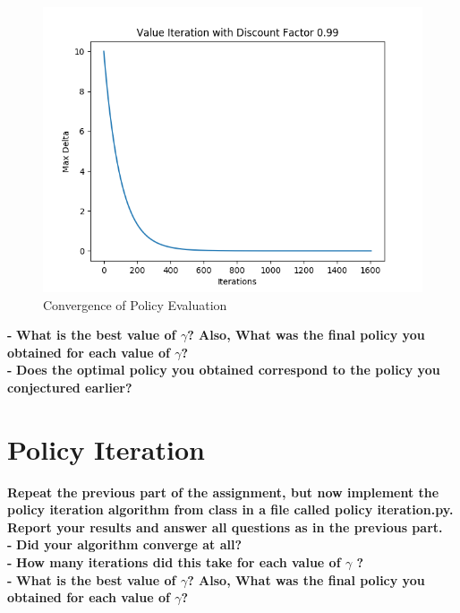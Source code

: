 \documentclass[11pt]{article}
\begin{document}
\begin{figure}[h]
\includegraphics[scale=0.7]{Value_99}
\centering
\caption{Convergence of Policy Evaluation}
\end{figure}

\noindent
\textbf{-}
\noindent
\textbf{What is the best value of $\gamma$? Also, What was the final policy you
obtained for each value of $\gamma$?}
\\

\noindent
\textbf{-}
\noindent
\textbf{Does the optimal policy you obtained correspond to the policy you
conjectured earlier?}
\\


\newpage
\section{Policy Iteration}
\textbf{Repeat the previous part of the assignment, but now implement the policy
iteration algorithm from class in a file called policy iteration.py. Report your
results and answer all questions as in the previous part.}
\\

\noindent
\textbf{-}
\noindent
\textbf{Did your algorithm converge at all?}
\\

\noindent
\textbf{-}
\noindent
\textbf{How many iterations did this take for each value of $\gamma$ ?}
\\

\noindent
\textbf{-}
\noindent
\textbf{What is the best value of $\gamma$? Also, What was the final policy you
obtained for each value of $\gamma$?}
\\
\end{document}
